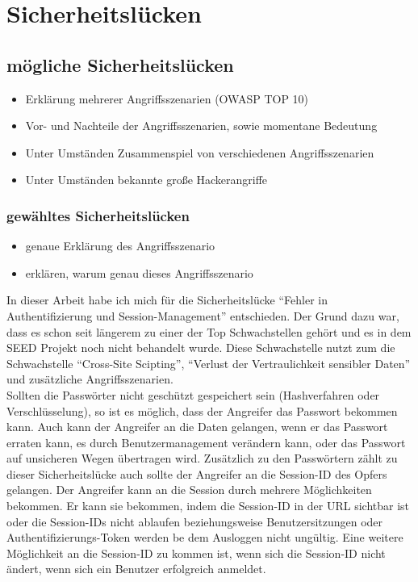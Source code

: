 \chapter{Sicherheitslücken}
\section{mögliche Sicherheitslücken}
\begin{itemize}
	\item Erklärung mehrerer Angriffsszenarien (OWASP TOP 10)
	\item Vor- und Nachteile der Angriffsszenarien, sowie momentane Bedeutung
	\item Unter Umständen Zusammenspiel von verschiedenen Angriffsszenarien
	\item Unter Umständen bekannte große Hackerangriffe
\end{itemize}
\subsection{gewähltes Sicherheitslücken}
\begin{itemize}
	\item genaue Erklärung des Angriffsszenario
	\item erklären, warum genau dieses Angriffsszenario
\end{itemize}
In dieser Arbeit habe ich mich für die Sicherheitslücke \enquote{Fehler in Authentifizierung und Session-Management} entschieden. Der Grund dazu war, dass es schon seit längerem zu einer der Top Schwachstellen gehört und es in dem SEED Projekt noch nicht behandelt wurde. Diese Schwachstelle nutzt zum die Schwachstelle \enquote{Cross-Site Scipting}, \enquote{Verlust der Vertraulichkeit sensibler Daten} und zusätzliche Angriffsszenarien. \\
Sollten die Passwörter nicht geschützt gespeichert sein (Hashverfahren oder Verschlüsselung), so ist es möglich, dass der Angreifer das Passwort bekommen kann. Auch kann der Angreifer an die Daten gelangen, wenn er das Passwort erraten kann, es durch Benutzermanagement verändern kann, oder das Passwort auf unsicheren Wegen übertragen wird. Zusätzlich zu den Passwörtern zählt zu dieser Sicherheitslücke auch sollte der Angreifer an die Session-ID des Opfers gelangen. Der Angreifer kann an die Session durch mehrere Möglichkeiten bekommen. Er kann sie bekommen, indem die Session-ID in der URL sichtbar ist oder die Session-IDs nicht ablaufen beziehungsweise Benutzersitzungen oder Authentifizierungs-Token werden be dem Ausloggen nicht ungültig. Eine weitere Möglichkeit an die Session-ID zu kommen ist, wenn sich die Session-ID nicht ändert, wenn sich ein Benutzer erfolgreich anmeldet. \\
